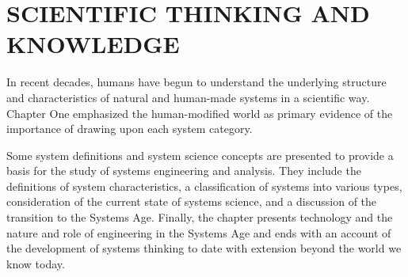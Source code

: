 \chapter{SCIENTIFIC THINKING AND KNOWLEDGE}\label{chap:02}

In recent decades, humans have begun to understand the underlying structure and characteristics of natural and human-made systems in a scientific way. Chapter One emphasized the human-modified world as primary evidence of the importance of drawing upon each system category.

Some system definitions and system science concepts are presented to provide a basis for the study of systems engineering and analysis. They include the definitions of system characteristics, a classification of systems into various types, consideration of the current state of systems science, and a discussion of the transition to the Systems Age. Finally, the chapter presents technology and the nature and role of engineering in the Systems Age and ends with an account of the development of systems thinking to date with extension beyond the world we know today.








